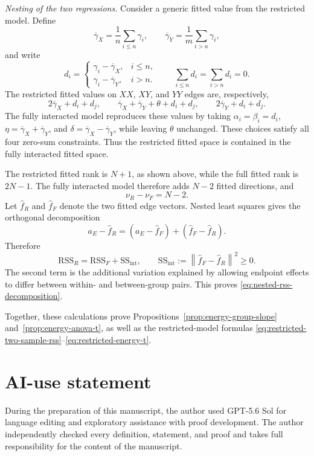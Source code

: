 \documentclass[11pt]{article}
\theoremstyle{plain}
\theoremstyle{definition}
\theoremstyle{remark}
\newcommand{\norm}[1]{\left\lVert #1\right\rVert}
\begin{document}
\smallskip
\noindent\emph{Nesting of the two regressions.}
Consider a generic fitted value from the restricted model.  Define
\[
 \overline\gamma_X=\frac1n\sum_{i\le n}\gamma_i,
 \qquad
 \overline\gamma_Y=\frac1m\sum_{i>n}\gamma_i,
\]
and write
\[
 d_i=
 \begin{cases}
  \gamma_i-\overline\gamma_X,&i\le n,\\
  \gamma_i-\overline\gamma_Y,&i>n.
 \end{cases}
 \qquad
 \sum_{i\le n}d_i=\sum_{i>n}d_i=0.
\]
The restricted fitted values on $XX$, $XY$, and $YY$ edges are, respectively,
\[
 2\overline\gamma_X+d_i+d_j,
 \qquad
 \overline\gamma_X+\overline\gamma_Y+\theta+d_i+d_j,
 \qquad
 2\overline\gamma_Y+d_i+d_j.
\]
The fully interacted model reproduces these values by taking
$\alpha_i=\beta_i=d_i$,
$\eta=\overline\gamma_X+\overline\gamma_Y$, and
$\delta=\overline\gamma_X-\overline\gamma_Y$, while leaving $\theta$
unchanged.  These choices satisfy all four zero-sum constraints.  Thus the
restricted fitted space is contained in the fully interacted fitted space.

The restricted fitted rank is $N+1$, as shown above, while the full fitted
rank is $2N-1$.  The fully interacted model therefore adds $N-2$ fitted
directions, and
\[
 \nu_R-\nu_F=N-2.
\]
Let $\widehat f_R$ and $\widehat f_F$ denote the two fitted edge vectors.
Nested least squares gives the orthogonal decomposition
\[
 a_E-\widehat f_R
 =(a_E-\widehat f_F)+(\widehat f_F-\widehat f_R).
\]
Therefore
\[
 \mathrm{RSS}_R
 =\mathrm{RSS}_F+\mathrm{SS}_{\mathrm{int}},
 \qquad
 \mathrm{SS}_{\mathrm{int}}
 :=\norm{\widehat f_F-\widehat f_R}^2\ge0.
\]
The second term is the additional variation explained by allowing endpoint
effects to differ between within- and between-group pairs.  This proves
\eqref{eq:nested-rss-decomposition}.

Together, these calculations prove
Propositions~\ref{prop:energy-group-slope} and~\ref{prop:energy-anova-t}, as
well as the restricted-model formulas
\eqref{eq:restricted-two-sample-rss}--\eqref{eq:restricted-energy-t}.


\section*{AI-use statement}
During the preparation of this manuscript, the author used GPT-5.6 Sol for
language editing and exploratory assistance with proof
development.  The author independently checked every definition, statement,
and proof and takes full responsibility for the content of the manuscript.
\end{document}
